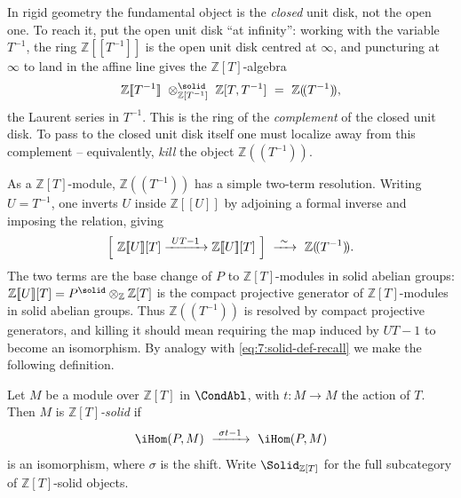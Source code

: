 In rigid geometry the fundamental object is the \emph{closed} unit disk, not
the open one. To reach it, put the open unit disk ``at infinity'': working with
the variable $T^{-1}$, the ring $\mathbb{Z}[\![T^{-1}]\!]$ is the open unit
disk centred at $\infty$, and puncturing at $\infty$ to land in the affine line
gives the $\mathbb{Z}[T]$-algebra
\begin{equation}
\label{eq:7:complement}
\mathbb{Z}[\![T^{-1}]\!]\ \otimes^{\solid}_{\mathbb{Z}[T^{-1}]}\
\mathbb{Z}[T,T^{-1}]\ =\ \mathbb{Z}(\!(T^{-1})\!),
\end{equation}
the Laurent series in $T^{-1}$. This is the ring of the \emph{complement} of
the closed unit disk. To pass to the closed unit disk itself one must localize
away from this complement -- equivalently, \emph{kill} the object
$\mathbb{Z}(\!(T^{-1})\!)$.

As a $\mathbb{Z}[T]$-module, $\mathbb{Z}(\!(T^{-1})\!)$ has a simple two-term
resolution. Writing $U=T^{-1}$, one inverts $U$ inside $\mathbb{Z}[\![U]\!]$ by
adjoining a formal inverse and imposing the relation, giving
\begin{equation}
\label{eq:7:complement-resolution}
\Bigl[\ \mathbb{Z}[\![U]\!][T]\xrightarrow{\ UT-1\ }\mathbb{Z}[\![U]\!][T]\ \Bigr]
\ \xrightarrow{\ \sim\ }\ \mathbb{Z}(\!(T^{-1})\!).
\end{equation}
The two terms are the base change of $P$ to $\mathbb{Z}[T]$-modules in solid
abelian groups: $\mathbb{Z}[\![U]\!][T]=P^{\solid}\otimes_{\mathbb{Z}}
\mathbb{Z}[T]$ is the compact projective generator of $\mathbb{Z}[T]$-modules
in solid abelian groups. Thus $\mathbb{Z}(\!(T^{-1})\!)$ is resolved by
compact projective generators, and killing it should mean requiring the map
induced by $UT-1$ to become an isomorphism. By analogy with
\eqref{eq:7:solid-def-recall} we make the following definition.

\begin{definition}
\label{def:7:ZT-solid}
Let $M$ be a module over $\mathbb{Z}[T]$ in $\CondAbl$, with $t\colon M\to M$
the action of $T$. Then $M$ is \emph{$\mathbb{Z}[T]$-solid} if
\begin{equation}
\label{eq:7:ZT-solid-def}
\iHom(P,M)\ \xrightarrow{\ \sigma t-1\ }\ \iHom(P,M)
\end{equation}
is an isomorphism, where $\sigma$ is the shift. Write $\Solid_{\mathbb{Z}[T]}$
for the full subcategory of $\mathbb{Z}[T]$-solid objects.
\end{definition}

